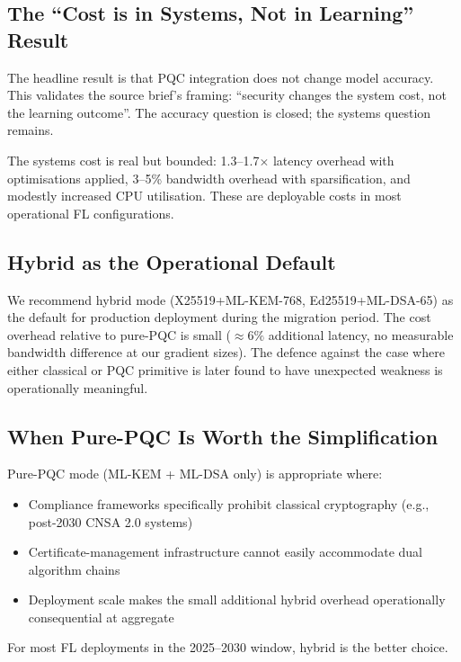 \documentclass[sigconf,nonacm]{acmart}
\begin{document}
\subsection{The ``Cost is in Systems, Not in Learning'' Result}

The headline result is that PQC integration does not change model
accuracy. This validates the source brief's framing: ``security
changes the system cost, not the learning outcome''. The accuracy
question is closed; the systems question remains.

The systems cost is real but bounded: 1.3--1.7$\times$ latency
overhead with optimisations applied, 3--5\% bandwidth overhead with
sparsification, and modestly increased CPU utilisation. These are
deployable costs in most operational FL configurations.

\subsection{Hybrid as the Operational Default}

We recommend hybrid mode (X25519+ML-KEM-768, Ed25519+ML-DSA-65) as
the default for production deployment during the migration period.
The cost overhead relative to pure-PQC is small ($\approx 6\%$
additional latency, no measurable bandwidth difference at our
gradient sizes). The defence against the case where either
classical or PQC primitive is later found to have unexpected
weakness is operationally meaningful.

\subsection{When Pure-PQC Is Worth the Simplification}

Pure-PQC mode (ML-KEM + ML-DSA only) is appropriate where:

\begin{itemize}
  \item Compliance frameworks specifically prohibit classical
        cryptography (e.g., post-2030 CNSA 2.0 systems)
  \item Certificate-management infrastructure cannot easily
        accommodate dual algorithm chains
  \item Deployment scale makes the small additional hybrid overhead
        operationally consequential at aggregate
\end{itemize}

For most FL deployments in the 2025--2030 window, hybrid is the
better choice.
\end{document}
